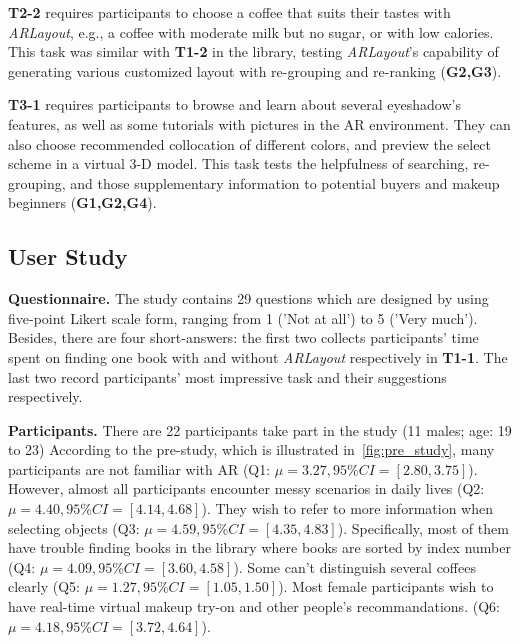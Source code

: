 \textbf{T2-2} requires participants to choose a coffee that suits their tastes with \textit{ARLayout}, e.g.,
a coffee with moderate milk but no sugar, or with low calories.
This task was similar with \textbf{T1-2} in the library,
testing \textit{ARLayout}'s capability of generating various customized layout 
with re-grouping and re-ranking (\textbf{G2,G3}).


\textbf{T3-1} requires participants to browse and learn about several eyeshadow's features,
as well as some tutorials with pictures in the AR environment.
They can also choose recommended collocation of different colors,
and preview the select scheme in a virtual 3-D model.
This task tests the helpfulness of searching, re-grouping, and those supplementary information to
potential buyers and makeup beginners (\textbf{G1,G2,G4}).


\subsection{User Study}

\textbf{Questionnaire.}
The study contains 29 questions which are designed by using  
five-point Likert scale form, ranging from 1 ('Not at all') to 5 ('Very much').
Besides, there are four short-answers: the first two collects participants' time spent on
finding one book with and without \textit{ARLayout} respectively in \textbf{T1-1}.
The last two record participants' most impressive task and their suggestions respectively.

\textbf{Participants.}
There are 22 participants take part in the study (11 males; age: 19 to 23)%
According to the pre-study,
which is illustrated in~\autoref{fig:pre_study},
many participants are not familiar with AR (Q1: $\mu = 3.27, 95\% CI = [2.80,3.75]$).
However, almost all participants encounter messy scenarios in daily lives (Q2: $\mu = 4.40, 95\% CI = [4.14,4.68]$).
They wish to refer to more information when selecting objects (Q3: $\mu = 4.59, 95\% CI = [4.35,4.83]$).
Specifically, most of them have trouble finding books
in the library where books are sorted by index number (Q4: $\mu = 4.09, 95\% CI = [3.60,4.58]$).
Some can't distinguish several coffees clearly (Q5: $\mu = 1.27, 95\% CI = [1.05,1.50]$).
Most female participants wish to have real-time virtual makeup try-on and other people's recommandations. (Q6: $\mu = 4.18, 95\% CI = [3.72,4.64]$).

